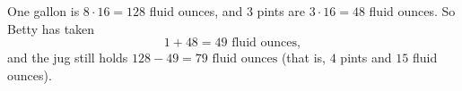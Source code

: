 One gallon is $8\cdot16=128$ fluid ounces, and $3$ pints are $3\cdot16=48$ fluid ounces. So Betty has taken
\[1+48=\boxed{49\text{ fluid ounces}},\]
and the jug still holds $128-49=\boxed{79\text{ fluid ounces}}$ (that is, $4$ pints and $15$ fluid ounces).
